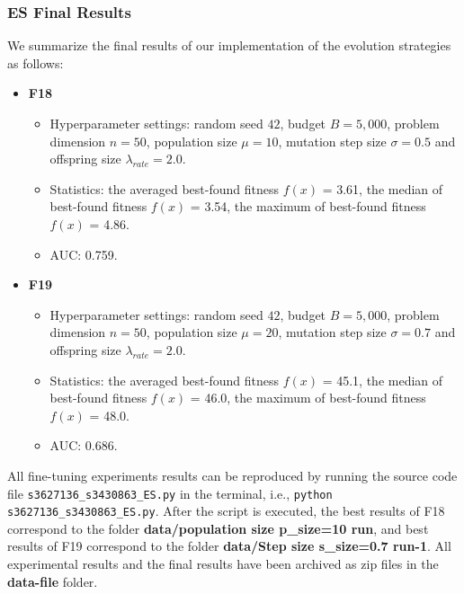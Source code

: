\documentclass{article}
\begin{document}
\subsubsection{ES Final Results}
We summarize the final results of our implementation of the evolution strategies as follows:

\begin{itemize}
    \item \textbf{F18}
        \begin{itemize}
            \item Hyperparameter settings: random seed $42$, budget $B = 5,000$, problem dimension $n = 50$, population size $\mu = 10$, mutation step size $\sigma = 0.5$ and offspring size $\lambda_{rate} = 2.0$.
            \item Statistics: the averaged best-found fitness $f(x)$ = 3.61, the median of best-found fitness $f(x)$ = 3.54, the maximum of best-found fitness $f(x)$ = 4.86.
            \item AUC: 0.759.
        \end{itemize}
    \item \textbf{F19}
        \begin{itemize}
            \item Hyperparameter settings: random seed $42$, budget $B = 5,000$, problem dimension $n = 50$, population size $\mu = 20$, mutation step size $\sigma = 0.7$ and offspring size $\lambda_{rate} = 2.0$.
            \item Statistics: the averaged best-found fitness $f(x)$ = 45.1, the median of best-found fitness $f(x)$ = 46.0, the maximum of best-found fitness $f(x)$ = 48.0.
            \item AUC: 0.686.
        \end{itemize}
\end{itemize}

 All fine-tuning experiments results can be reproduced by running the source code file \texttt{s3627136\_s3430863\_ES.py} in the terminal, i.e., \texttt{python s3627136\_s3430863\_ES.py}. After the script is executed, the best results of F18 correspond to the folder \textbf{data/population size p\_size=10 run}, and best results of F19 correspond to the folder \textbf{data/Step size s\_size=0.7 run-1}. All experimental results and the final results have been archived as zip files in the \textbf{data-file} folder. 
\end{document}
